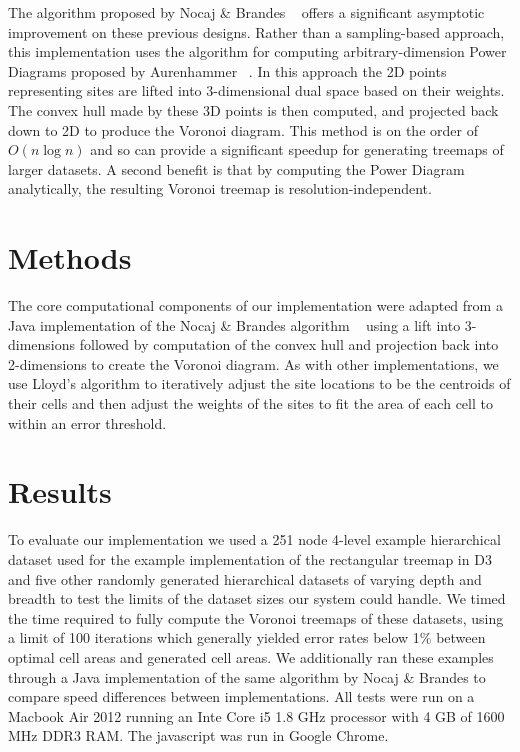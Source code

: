 \documentclass{acm_proc_article-sp}
\begin{document}
The algorithm proposed by Nocaj \& Brandes ~\cite{nocaj:faster} offers
a significant asymptotic improvement on these previous designs. Rather
than a sampling-based approach, this implementation uses the algorithm
for computing arbitrary-dimension Power Diagrams proposed by
Aurenhammer ~\cite{aurenhammer:power}. In this approach the 2D points
representing sites are lifted into 3-dimensional dual space based on
their weights. The convex hull made by these 3D points is then
computed, and projected back down to 2D to produce the Voronoi
diagram. This method is on the order of $O(n \log n)$ and so can
provide a significant speedup for generating treemaps of larger
datasets. A second benefit is that by computing the Power Diagram analytically,
the resulting Voronoi treemap is resolution-independent.

\section{Methods}
\label{sec:methods}
The core computational components of our implementation were adapted
from a Java implementation of the Nocaj \& Brandes algorithm
~\cite{nocaj:faster} using a lift into 3-dimensions followed by
computation of the convex hull and projection back into 2-dimensions
to create the Voronoi diagram. As with other implementations, we use
Lloyd's algorithm to iteratively adjust the site locations to be the
centroids of their cells and then adjust the weights of the sites to
fit the area of each cell to within an error threshold.

\section{Results}
\label{sec:results}
To evaluate our implementation we used a 251 node 4-level example
hierarchical dataset used for the example implementation of the
rectangular treemap in D3 and five other randomly generated
hierarchical datasets of varying depth and breadth to test the limits
of the dataset sizes our system could handle. We timed the time
required to fully compute the Voronoi treemaps of these datasets,
using a limit of 100 iterations which generally yielded error rates
below 1\% between optimal cell areas and generated cell areas. We
additionally ran these examples through a Java implementation of the
same algorithm by Nocaj \& Brandes to compare speed differences
between implementations. All tests were run on a Macbook Air 2012
running an Inte Core i5 1.8 GHz processor with 4 GB of 1600 MHz DDR3
RAM. The javascript was run in Google Chrome.
\end{document}
